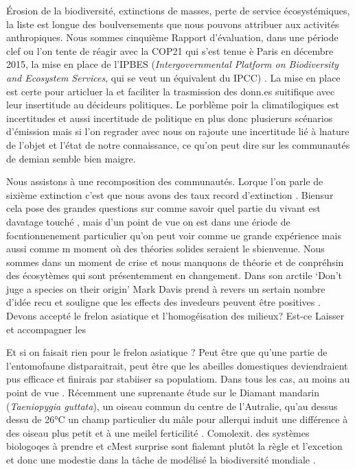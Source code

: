 Érosion de la biodiversité, extinctions de masses, perte de service
écosystémiques, la liste est longue des boulversements que nous pouvons
attribuer aux activités anthropiques. Nous sommes cinquième Rapport
d'évaluation, dans une période clef ou l'on tente de réagir avec la
COP21 qui s'est tenue è Paris en décembre 2015, la mise en place de
l'IPBES
(\emph{Intergovernmental Platform on Biodiversity and Ecosystem Services},
qui se veut un équivalent du IPCC) \citep{Diaz2015a}. La mise en place
est certe pour articluer la et faciliter la trasmission des donn.es
suitifique avec leur insertitude au décideurs politiques. Le porblème
poir la climatilogiques est incertitudes et aussi incertitude de
politique en plus donc plusierurs scénarios d'émission mais si l'on
regrader avec nous on rajoute une incertitude lié à lnature de l'objet
et l'état de notre connaissance, ce qu'on peut dire sur les communautés
de demian semble bien maigre.

Nous assistons à une recomposition des communautés. Lorque l'on parle de
sixième extinction c'est que nous avons des taux record d'extinction
\citep{Thomas2004}. Biensur cela pose des grandes questions sur comme
savoir quel partie du vivant est davatage touché \citep{Thuiller2011},
mais d'un point de vue on est dans une ériode de focntionnenement
particulier qu'on peut voir comme ue grande expérience mais aussi comme
m moment où des théories solides seraient le sbienvenue. Nous sommes
dans un moment de crise et nous manquons de théorie et de conpréhsin des
écosytèmes qui sont présentemment en changement. Dans son arctile `Don't
juge a species on their origin' Mark Davis prend à revers un sertain
nombre d'idée recu et souligne que les effects des invedeurs peuvent
être positives \citet{Davis2011}. Devons accepté le frelon asiatique et
l'homogéisation des milieux? Est-ce Laisser et accompagner les

Et si on faisait rien pour le frelon asiatique ? Peut être que qu'une
partie de l'entomofaune distparaitrait, peut être que les abeilles
domestiques deviendraient pus efficace et finirais par stabiiser sa
populatiom. Dans tous les cas, au moins au point de vue
\citep{Villemant2011}. Récemment une suprenante étude sur le Diamant
mandarin (\emph{Taeniopygia guttata}), un oiseau commun du centre de
l'Autralie, qu'au dessus dessu de 26°C un champ particulier du mâle pour
allerqui induit une différence à des oiseau plus petit et à une meilel
ferticilité \citep{Mariette2016}. Comolexit. des systèmes biologoqes à
prendre et cMest surprise sont fialemnt plutôt la règle et l'excetion et
donc une modestie dans la tâche de modélisé la biodiversité mondiale
\citep{Mouquet2015}.

